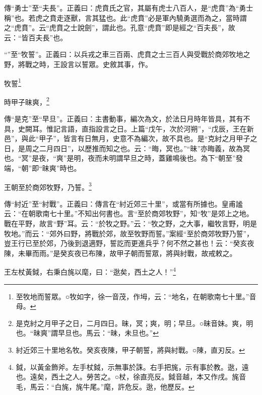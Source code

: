 {\noindent\zhuan{}\fzbyks 傳“勇士”至“夫長”。正義曰：虎賁氏之官，其屬有虎士八百人，是“虎賁”為“勇士稱”也。若虎之賁走逐獸，言其猛也。此“虎賁”必是軍內驍勇選而為之，當時謂之“虎賁”。云“虎賁之士說劍”，謂此也。孔意“虎賁”即是經之“百夫長”，故云：“皆百夫長”也。 \par}

{\noindent\shu{}\fzkt “”至“牧誓”。正義曰：以兵戎之車三百兩、虎賁之士三百人與受戰於商郊牧地之野，將戰之時，王設言以誓眾。史敘其事，作。 \par}

牧誓\footnote{至牧地而誓眾。○牧如字，徐一音茂，作坶，云：“地名，在朝歌南七十里。”音母。}

時甲子昧爽，\footnote{是克紂之月甲子之日，二月四日。昧，冥；爽，明；早旦。○昧音妹。爽，明也。“昧爽”謂早旦也。馬云：“昧，未旦也。”}

{\noindent\zhuan{}\fzbyks 傳“是克”至“早旦”。正義曰：主書動事，編次為文，於法日月時年皆具，其有不具，史闕耳。惟記言語，直指設言之日。上篇“戊午，次於河朔”，“戊辰，王在新邑”，與此“甲子”，皆言有日無月，史意不為編次，故不具也。是“克紂之月甲子之日，是周之二月四日”，以歷推而知之也。云：“晦，冥也。”“昧”亦晦義，故為冥也。“冥”是夜，“爽”是明，夜而未明謂早旦之時，蓋雞鳴後也。為下“朝至”發端，“朝”即“昧爽”時也。 \par}

王朝至於商郊牧野，乃誓。\footnote{紂近郊三十里地名牧。癸亥夜陳，甲子朝誓，將與紂戰。○陳，直刃反。}

{\noindent\zhuan{}\fzbyks 傳“紂近”至“紂戰”。正義曰：傳言在“紂近郊三十里”，或當有所據也。皇甫謐云：“在朝歌南七十里。”不知出何書也。言“至於商郊牧野”，知“牧”是郊上之地。戰在平野，故言“野”耳。云：“於牧之野。”云：“牧之野，之大事，繼牧言野，明是牧地。”而云：“郊外曰野，將戰於郊，故至牧野而誓。”案經“至於商郊牧野乃誓”，豈王行已至於郊，乃後到退適野，誓訖而更進兵乎？何不然之甚也！云：“癸亥夜陳，未畢而雨。”是癸亥夜已布陳，故甲子朝而誓眾，將與紂戰，故戒敕之。 \par}

王左杖黃鉞，右秉白旄以麾，曰：“逖矣，西土之人！”\footnote{鉞，以黃金飾斧。左手杖鉞，示無事於誅。右手把旄，示有事於教。逖，遠也。遠矣，西土之人。勞苦之。○杖，徐直亮反。鉞音越，本又作戌。旄音毛，馬云：“白旄，旄牛尾。”麾，許危反。逖，他歷反。}

